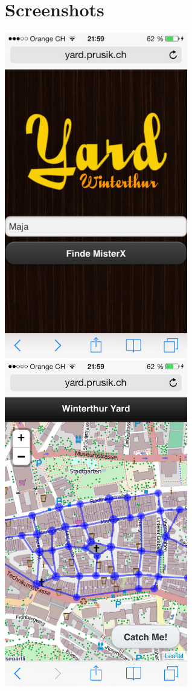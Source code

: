 \documentclass[11pt]{article}
\begin{document}
\section{Screenshots}
\includegraphics[width=8cm]{Bilder/HomeScreen.jpg}
\includegraphics[width=8cm]{Bilder/Karte.jpg}
\end{document}
